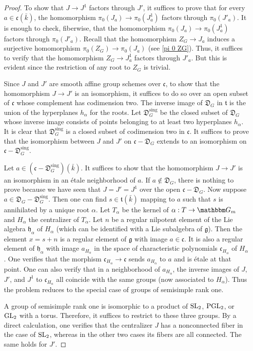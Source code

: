\documentclass[12pt,english]{smfart}
\numberwithin{equation}{subsection}
\theoremstyle{remark}
\newcommand\GG{{\mathbbm G}}
\newcommand\GL{{\rm GL}}
\newcommand\SL{{\rm SL}}
\newcommand\PGL{{\rm PGL}}
\newcommand\discrim{\mathfrak D}
\begin{document}
\begin{proof}
To show that $J\to J^1$ factors through $J'$, it suffices to prove that for every $a\in\mathfrak{c}(\bar{k})$, the homomorphism $\pi_0(J_a)\to \pi_0(J_a^1)$ factors through $\pi_0(J'_a)$. It is enough to check, fiberwise, that the homomorphism $\pi_0(J_a)\to \pi_0(J_a^1)$ factors through $\pi_0(J'_a)$. Recall that the homomorphism $Z_G\to J_a$ induces a surjective homomorphism $\pi_0(Z_G)\to \pi_0(J_a)$ (see \ref{pi 0 ZG}). Thus, it suffices to verify that the homomorphism $Z_G\to J^1_a$ factors through $J'_a$. But this is evident since the restriction of any root to $Z_G$ is trivial.

Since $J$ and $J'$ are smooth affine group schemes over $\mathfrak{c}$, to show that the homomorphism $J\to J'$ is an isomorphism, it suffices to do so over an open subset of $\mathfrak{c}$ whose complement has codimension two. The inverse image of $\discrim_G$ in $\mathfrak{t}$ is the union of the hyperplanes $h_\alpha$ for the roots. Let $\discrim_G^{\mathrm{sing}}$ be the closed subset of $\discrim_G$ whose inverse image consists of points belonging to at least two hyperplanes $h_\alpha$. It is clear that $\discrim_G^{\mathrm{sing}}$ is a closed subset of codimension two in $\mathfrak{c}$. It suffices to prove that the isomorphism between $J$ and $J'$ on $\mathfrak{c}-\discrim_G$ extends to an isomorphism on $\mathfrak{c}-\discrim_G^{\mathrm{sing}}$.

Let $a\in (\mathfrak{c}-\discrim_G^{\mathrm{sing}})(\bar{k})$. It suffices to show that the homomorphism $J\to J'$ is an isomorphism in an \'etale neighborhood of $a$. If $a\notin \discrim_G$, there is nothing to prove because we have seen that $J=J'=J^1$ over the open $\mathfrak{c}-\discrim_G$. Now suppose $a\in \discrim_G-\discrim_G^{\mathrm{sing}}$. Then one can find $s\in\mathfrak{t}(\bar{k})$ mapping to $a$ such that $s$ is annihilated by a unique root $\alpha$. Let $T_\alpha$ be the kernel of $\alpha:T\to\GG_m$ and $H_\alpha$ the centralizer of $T_\alpha$. Let $n$ be a regular nilpotent element of the Lie algebra $\mathfrak{h}_\alpha$ of $H_\alpha$ (which can be identified with a Lie subalgebra of $\mathfrak{g}$). Then the element $x=s+n$ is a regular element of $\mathfrak{g}$ with image $a\in\mathfrak{c}$. It is also a regular element of $\mathfrak{h}_\alpha$ with image $a_{H_\alpha}$ in the space of characteristic polynomials $\mathfrak{c}_{H_\alpha}$ of $H_\alpha$. One verifies that the morphism $\mathfrak{c}_{H_\alpha}\to\mathfrak{c}$ sends $a_{H_\alpha}$ to $a$ and is \'etale at that point. One can also verify that in a neighborhood of $a_{H_\alpha}$, the inverse images of $J$, $J'$, and $J^1$ to $\mathfrak{c}_{H_\alpha}$ all coincide with the same groups (now associated to $H_\alpha$). Thus the problem reduces to the special case of groups of semisimple rank one.

A group of semisimple rank one is isomorphic to a product of $\SL_2$, $\PGL_2$, or $\GL_2$ with a torus. Therefore, it suffices to restrict to these three groups. By a direct calculation, one verifies that the centralizer $J$ has a nonconnected fiber in the case of $\SL_2$, whereas in the other two cases its fibers are all connected. The same holds for $J'$.
\end{proof}
\end{document}
